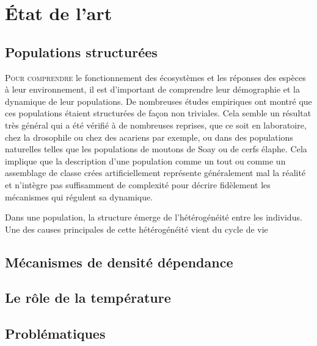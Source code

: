 \chapter{État de l'art}

\section{Populations structurées}

\lettrine[lines=3]{P}{our comprendre} le fonctionnement des écosystèmes et les
réponses des espèces à leur environnement, il est d'important de comprendre leur démographie et la
dynamique de leur populations. De nombreuses études empiriques ont montré que
ces populations étaient structurées de façon non triviales. Cela semble un 
résultat très général qui a été vérifié à de nombreuses reprises, que ce soit en
laboratoire, chez la drosophile ou chez des acariens par exemple, ou dans des
populations naturelles telles que les populations de moutons de Soay ou de cerfs
élaphe. Cela implique que la description d'une population comme un tout ou comme
un assemblage de classe crées artificiellement représente généralement mal la
réalité et n'intègre pas suffisamment de complexité pour décrire fidèlement les
mécanismes qui régulent sa dynamique. 

Dans une population, la structure émerge de l'hétérogénéité entre les
individus. Une des causes principales de cette hétérogénéité vient du cycle de
vie 

\section{Mécanismes de densité dépendance}

\section{Le rôle de la température}

\section{Problématiques}	
